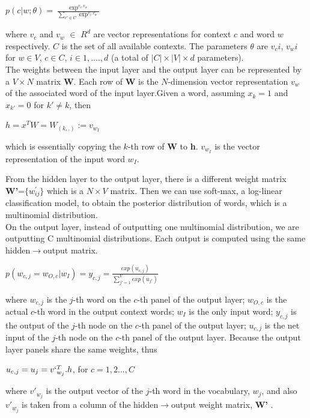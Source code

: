 \documentclass[11pt,a4paper]{article}
\begin{document}
\begin{center} $p(c|w;\theta)=\frac{\exp^{v_c.v_w}}{\sum_{c' \in C}\exp^{v_c.v_w}}$ \end{center}
where $v_c$ and $v_w$ $\in$ $R^d$ are vector representations for context $c$ and word $w$ respectively. $C$ is the set of all available contexts. The parameters $\theta$ are $v_ci$, $v_wi$ for $w \in V$, $c \in C$, $i \in 1,....,d$ (a total of $|C| \times |V| \times d$ parameters).\\

The weights between the input layer and the output layer can be represented by a $V \times N$ matrix \textbf{W}. Each row of \textbf{W} is the $N$-dimension vector representation $v_w$ of the associated word of the input layer.Given a word, assuming $x_k=1$ and $x_{k'}=0$ for $k' \neq k$, then
\begin{center}
$h=x^TW=W_{(k,.)}:=v_{w_I}$
\end{center}
which is essentially copying the $k$-th row of \textbf{W} to \textbf{h}. $v_{w_I}$ is the vector representation of the input word $w_I$.

From the hidden layer to the output layer, there is a different weight matrix \textbf{W'}=$\{w_{ij}^{'}\}$ which is a $N \times V$ matrix. Then we can use soft-max, a log-linear classification model, to obtain the posterior distribution of words, which is a multinomial distribution.\\
On the output layer, instead of outputting one multinomial distribution, we are outputting C multinomial distributions. Each output is computed using the same hidden$\rightarrow$output matrix.
\begin{center}
$p(w_{c,j}=w_{O,c}|w_I)=y_{c,j}=\frac{exp(u_{c,j})}{\sum_{j'=1}^{V}exp(u_{j'})}$
\end{center}
where $w_{c,j}$ is the $j$-th word on the $c$-th panel of the output layer; $w_{O,c}$ is the actual $c$-th word in the output context words; $w_I$ is the only input word; $y_{c,j}$ is the output of the $j$-th node on the $c$-th panel of the output layer; $u_{c,j}$ is the net input of the $j$-th node on the $c$-th panel of the output layer.
Because the output layer panels share the same weights, thus
\begin{center}
$u_{c,j}=u_j=v`_{w_j}^T.h$, for $c=1,2...,C$
\end{center}
where $v'_{w_j}$ is the output vector of the $j$-th word in the vocabulary, $w_j$, and also $v'_{w_j}$ is taken from a column of the hidden$\rightarrow$output weight matrix, \textbf{W'} .
\end{document}

